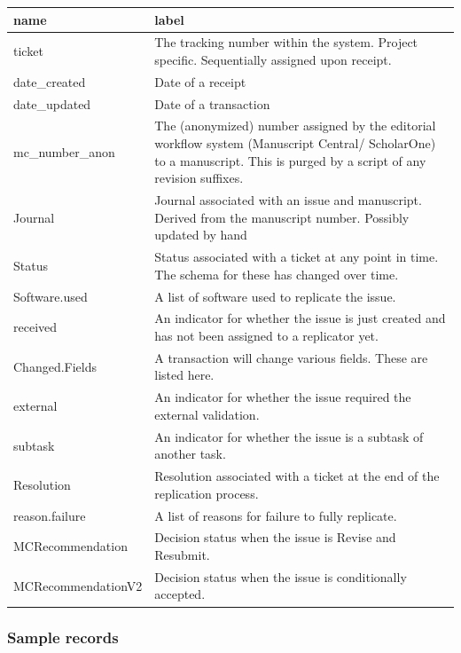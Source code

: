 \documentclass[
]{article}
\begin{document}
\begin{longtable}[]{@{}
  >{\raggedright\arraybackslash}p{}
  >{\raggedright\arraybackslash}p{}@{}}
\toprule
name & label \\
\midrule
\endhead
ticket & The tracking number within the system. Project specific.
Sequentially assigned upon receipt. \\
date\_created & Date of a receipt \\
date\_updated & Date of a transaction \\
mc\_number\_anon & The (anonymized) number assigned by the editorial
workflow system (Manuscript Central/ ScholarOne) to a manuscript. This
is purged by a script of any revision suffixes. \\
Journal & Journal associated with an issue and manuscript. Derived from
the manuscript number. Possibly updated by hand \\
Status & Status associated with a ticket at any point in time. The
schema for these has changed over time. \\
Software.used & A list of software used to replicate the issue. \\
received & An indicator for whether the issue is just created and has
not been assigned to a replicator yet. \\
Changed.Fields & A transaction will change various fields. These are
listed here. \\
external & An indicator for whether the issue required the external
validation. \\
subtask & An indicator for whether the issue is a subtask of another
task. \\
Resolution & Resolution associated with a ticket at the end of the
replication process. \\
reason.failure & A list of reasons for failure to fully replicate. \\
MCRecommendation & Decision status when the issue is Revise and
Resubmit. \\
MCRecommendationV2 & Decision status when the issue is conditionally
accepted. \\
\bottomrule
\end{longtable}

\hypertarget{sample-records}{%
\subsubsection{Sample records}\label{sample-records}}
\end{document}
